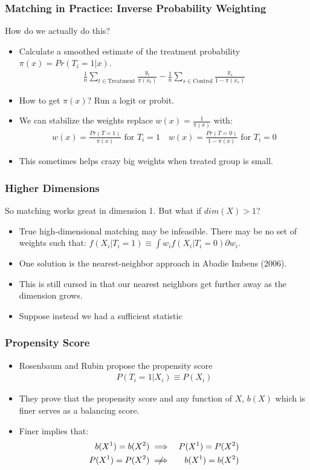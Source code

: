\documentclass[xcolor=pdftex,dvipsnames,table,mathserif,aspectratio=169]{beamer}
\begin{document}
\begin{frame}
\frametitle{Matching in Practice: \alert{Inverse Probability Weighting}}
How do we actually do this?
\begin{itemize}
\item Calculate a smoothed estimate of the treatment probability $\pi(x) = Pr(T_i =1 | x)$.
\begin{align*}
\frac{1}{n}\sum_{t \in \text{Treatment}} \frac{y_t}{\pi(x_t)} - \frac{1}{n} \sum_{s \in \text{Control}} \frac{y_s}{1-\pi(x_s)}
\end{align*}
\item How to get $\pi(x)$? Run a logit or probit.
\item We can stabilize the weights replace $w(x) =\frac{1}{\pi(x)}$ with:
\begin{align*}
w(x)=\frac{Pr(T=1)}{\pi(x)}  \mbox{ for } T_i=1 \quad
w(x)=\frac{Pr(T=0)}{1-\pi(x)} \mbox{ for } T_i=0
\end{align*}
\item This sometimes helps crazy big weights when treated group is small.
\end{itemize}
\end{frame}


\begin{frame}
\frametitle{Higher Dimensions}
So matching works great in dimension 1. But what if $dim(X) > 1$?
\begin{itemize}
\item True high-dimensional matching may be infeasible. There may be no set of weights such that:
$f(X_i | T_i=1) \equiv \int w_i f(X_i | T_i=0) \partial w_i $.
\item One solution is the nearest-neighbor approach in Abadie Imbens (2006).
\item This is still cursed in that our nearest neighbors get further away as the dimension grows.
\item Suppose instead we had a \alert{sufficient statistic}
\end{itemize}
\end{frame}

\begin{frame}
\frametitle{Propensity Score}
\begin{itemize}
\item Rosenbaum and Rubin propose the \alert{propensity score}
\begin{eqnarray*}
P(T_i  = 1 | X_i) \equiv P(X_i)
\end{eqnarray*}
\item They prove that the propensity score and any function of $X$, $b(X)$ which is finer serves as a \alert{balancing score}.
\item Finer implies that:
\begin{eqnarray*}
b(X^1) = b(X^2) &\implies& P(X^1) = P(X^2)\\
P(X^1) = P(X^2) & \centernot \implies & b(X^1) = b(X^2)
\end{eqnarray*}
\end{itemize}
\end{frame}
\end{document}
